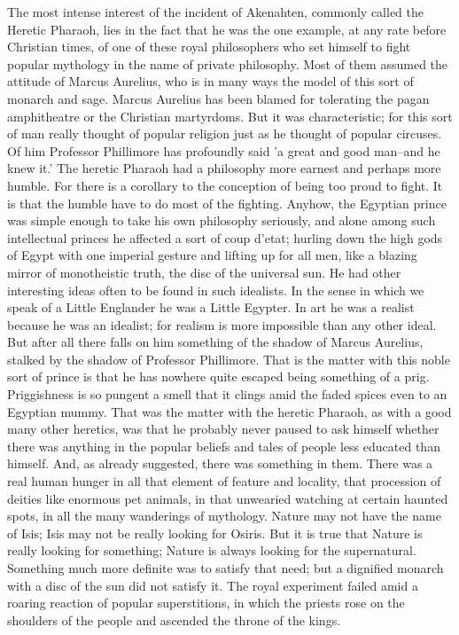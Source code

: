 The most intense interest of the incident of Akenahten, commonly called the Heretic Pharaoh, lies in the fact that he was the one example, at any rate before Christian times, of one of these royal philosophers who set himself to fight popular mythology in the name of private philosophy. Most of them assumed the attitude of Marcus Aurelius, who is in many ways the model of this sort of monarch and sage. Marcus Aurelius has been blamed for tolerating the pagan amphitheatre or the Christian martyrdoms. But it was characteristic; for this sort of man really thought of popular religion just as he thought of popular circuses. Of him Professor Phillimore has profoundly said 'a great and good man--and he knew it.' The heretic Pharaoh had a philosophy more earnest and perhaps more humble. For there is a corollary to the conception of being too proud to fight. It is that the humble have to do most of the fighting. Anyhow, the Egyptian prince was simple enough to take his own philosophy seriously, and alone among such intellectual princes he affected a sort of coup d'etat; hurling down the high gods of Egypt with one imperial gesture and lifting up for all men, like a blazing mirror of monotheistic truth, the disc of the universal sun. He had other interesting ideas often to be found in such idealists. In the sense in which we speak of a Little Englander he was a Little Egypter. In art he was a realist because he was an idealist; for realism is more impossible than any other ideal. But after all there falls on him something of the shadow of Marcus Aurelius, stalked by the shadow of Professor Phillimore. That is the matter with this noble sort of prince is that he has nowhere quite escaped being something of a prig. Priggishness is so pungent a smell that it clings amid the faded spices even to an Egyptian mummy. That was the matter with the heretic Pharaoh, as with a good many other heretics, was that he probably never paused to ask himself whether there was anything in the popular beliefs and tales of people less educated than himself. And, as already suggested, there was something in them. There was a real human hunger in all that element of feature and locality, that procession of deities like enormous pet animals, in that unwearied watching at certain haunted spots, in all the many wanderings of mythology. Nature may not have the name of Isis; Isis may not be really looking for Osiris. But it is true that Nature is really looking for something; Nature is always looking for the supernatural. Something much more definite was to satisfy that need; but a dignified monarch with a disc of the sun did not satisfy it. The royal experiment failed amid a roaring reaction of popular superstitions, in which the priests rose on the shoulders of the people and ascended the throne of the kings.

